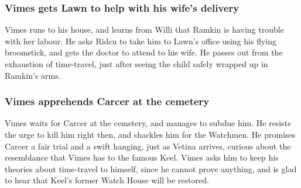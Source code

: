 \subsubsection{\Gls{Vimes} gets \Gls{Lawn} to help with his wife's delivery}
\Gls{Vimes} runs to his house, and learns from \Gls{Willi} that \Gls{Ramkin} is having trouble with
her labour. He asks \Gls{Ridcu} to take him to \Gls{Lawn}'s office using his flying broomstick, and
gets the doctor to attend to his wife. He passes out from the exhaustion of time-travel, just after
seeing the child safely wrapped up in \Gls{Ramkin}'s arms.

\subsubsection{\Gls{Vimes} apprehends \Gls{Carcer} at the cemetery}
\Gls{Vimes} waits for \Gls{Carcer} at the cemetery, and manages to subdue him. He resists the urge
to kill him right then, and shackles him for the Watchmen. He promises \Gls{Carcer} a fair trial and
a swift hanging, just as \Gls{Vetina} arrives, curious about the resemblance that \Gls{Vimes} has
to the famous \Gls{Keel}. \Gls{Vimes} asks him to keep his theories about time-travel to himself,
since he cannot prove anything, and is glad to hear that \Gls{Keel}'s former Watch House will be
restored.